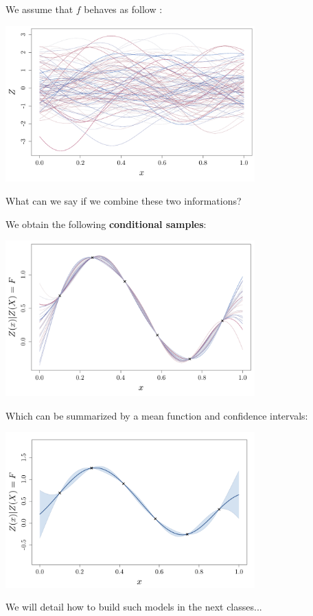 \documentclass{beamer}
\begin{document}
\begin{frame}{}
We assume that $f$ behaves as follow :
\begin{center}
\includegraphics[height=6cm]{figures/R/GPR_GaussPrior}
\end{center}
What can we say if we combine these two informations?
\end{frame}

\begin{frame}{}
We obtain the following \textbf{conditional samples}:
\begin{center}
\includegraphics[height=6cm]{figures/R/GPR_GaussPosterior}
\end{center}
\end{frame}

\begin{frame}{}
Which can be summarized by a mean function and confidence intervals:
\begin{center}
\includegraphics[height=6cm]{figures/R/GPR_GaussGPR}
\end{center}
We will detail how to build such models in the next classes...
\end{frame}
\end{document}
